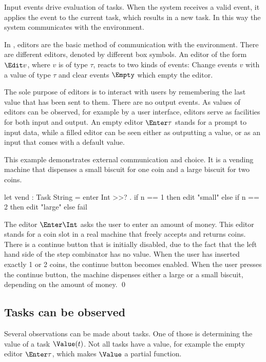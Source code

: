 Input events drive evaluation of tasks.
When the system receives a valid event, it applies the event to the current task, which results in a new task.
In this way the system communicates with the environment.

In \TOPHAT, editors are the basic method of communication with the environment.
There are different editors, denoted by different box symbols.
An editor of the form $\Edit v$, where $v$ is of type $\tau$, reacts to two kinds of events:
Change events $v$ with a value of type $\tau$ and clear events $\Empty$ which empty the editor.

The sole purpose of editors is to interact with users by remembering the last value that has been sent to them.
There are no output events.
As values of editors can be observed, for example by a user interface, editors serve as facilities for both input and output.
An empty editor $\Enter \tau$ stands for a prompt to input data, while a filled editor can be seen either as outputting a value, or as an input that comes with a default value.

\begin{example}
\label{Vending machine}

This example demonstrates external communication and choice.
It is a vending machine that dispenses a small biscuit for one coin and a large biscuit for two coins.
\begin{TASK}
  let vend : Task String = enter Int >>? \n. if n == 1 then edit "small"
    else if n == 2 then edit "large"
    else fail
\end{TASK}
The editor $\Enter \Int$ asks the user to enter an amount of money.
This editor stands for a coin slot in a real machine that freely accepts and returns coins.
There is a continue button that is initially disabled, due to the fact that the left hand side of the step combinator has no value.
When the user has inserted exactly 1 or 2 coins, the continue button becomes enabled.
When the user presses the continue button, the machine dispenses either a large or a small biscuit, depending on the amount of money. \qed

\end{example}



\subsection{Tasks can be observed}

Several observations can be made about tasks.
One of those is determining the value of a task $\Value(t)$.
Not all tasks have a value, for example the empty editor $\Enter \tau$, which makes $\Value$ a partial function.

